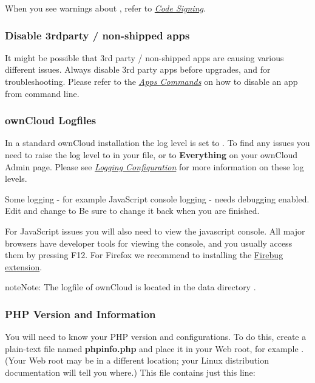 \documentclass[letterpaper,10pt,english]{sphinxmanual}
\begin{document}
When you see warnings about , refer to {\hyperref[issues/code_signing::doc]{\emph{\emph{Code Signing}}}}.


\subsubsection{Disable 3rdparty / non-shipped apps}
\label{issues/general_troubleshooting:disable-3rdparty-non-shipped-apps}
It might be possible that 3rd party / non-shipped apps are causing various
different issues. Always disable 3rd party apps before upgrades, and for
troubleshooting. Please refer to the {\hyperref[configuration_server/occ_command:apps\string-commands\string-label]{\emph{Apps Commands}}} on how
to disable an app from command line.


\subsubsection{ownCloud Logfiles}
\label{issues/general_troubleshooting:owncloud-logfiles}
In a standard ownCloud installation the log level is set to . To find
any issues you need to raise the log level to  in your 
file, or to \textbf{Everything} on your ownCloud Admin page. Please see
{\hyperref[configuration_server/logging_configuration::doc]{\emph{\emph{Logging Configuration}}}} for more information on
these log levels.

Some logging - for example JavaScript console logging - needs debugging
enabled. Edit  and change  to
 Be sure to change it back when you are finished.

For JavaScript issues you will also need to view the javascript console. All
major browsers have developer tools for viewing the console, and you
usually access them by pressing F12. For Firefox we recommend to installing
the \href{https://getfirebug.com/}{Firebug extension}.

\begin{notice}{note}{Note:}
The logfile of ownCloud is located in the data directory
.
\end{notice}


\subsubsection{PHP Version and Information}
\label{issues/general_troubleshooting:label-phpinfo}\label{issues/general_troubleshooting:php-version-and-information}
You will need to know your PHP version and configurations. To do this, create a
plain-text file named \textbf{phpinfo.php} and place it in your Web root, for
example . (Your Web root may be in a different
location; your Linux distribution documentation will tell you where.) This file
contains just this line:
\end{document}

